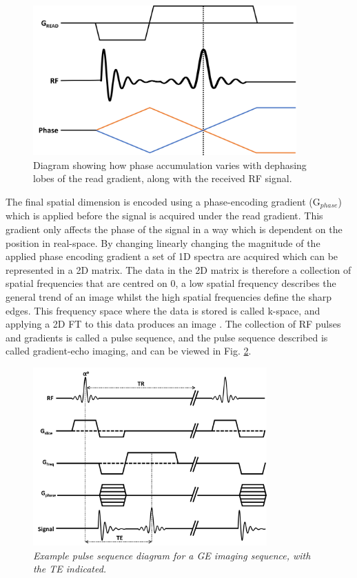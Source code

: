 \begin{figure}
    \centering
    \includegraphics[width=0.9\textwidth]{Figures/Theory/RePhasing.png}
    \caption{Diagram showing how phase accumulation varies with dephasing lobes of the read gradient, along with the received \ac{RF} signal.}
    \label{fig:enter-label}
\end{figure}

The final spatial dimension is encoded using a phase-encoding gradient (G$_{phase}$) which is applied before the signal is acquired under the read gradient. This gradient only affects the phase of the signal in a way which is dependent on the position in real-space. By changing linearly changing the magnitude of the applied phase encoding gradient a set of 1D spectra are acquired which can be represented in a 2D matrix. The data in the 2D matrix is therefore a collection of spatial frequencies that are centred on 0, a low spatial frequency describes the general trend of an image whilst the high spatial frequencies define the sharp edges. This frequency space where the data is stored is called k-space, and applying a 2D \ac{FT} to this data produces an image \cite{Lauterbur1973ImageResonance, Mansfield1977Multi-planarEchoes}. The collection of \ac{RF} pulses and gradients is called a pulse sequence, and the pulse sequence described is called gradient-echo imaging, and can be viewed in Fig. \ref{fig:theory:GRE}.

\begin{figure}
    \centering
    \includegraphics[width=0.8\textwidth]{Figures/Theory/GRE_sequence.png}
    \caption{\textit{Example pulse sequence diagram for a \ac{GE} imaging sequence, with the \ac{TE} indicated.}}
    \label{fig:theory:GRE}
\end{figure}

